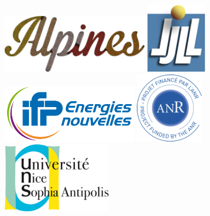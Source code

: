 \vspace{2cm}
\begin{figure}[h!]

\hspace{2.25cm}\includegraphics[height=2.5cm]{../logo/logo_alpines.pdf}
\hspace{0.5cm}\includegraphics[height=3cm]{../logo/logo_ljll.pdf}\\[10pt]

\hspace{0.5cm}\includegraphics[height=2.5cm]{../logo/logo_ifpen.pdf}
\hspace{0.5cm}\includegraphics[height=3cm]{../logo/logo_anr.png}
\hspace{0.5cm}\includegraphics[height=3cm]{../logo/logo_unice.png}

\end{figure}

